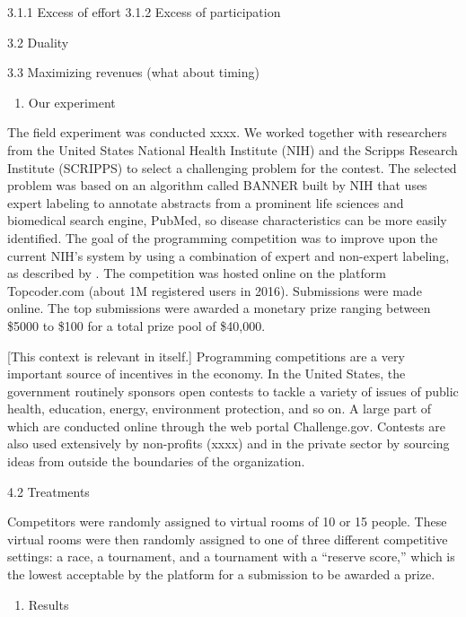 \documentclass[12pt,]{article}
\providecommand{\tightlist}{%
  \setlength{\itemsep}{0pt}\setlength{\parskip}{0pt}}
\begin{document}
3.1.1 Excess of effort 3.1.2 Excess of participation

3.2 Duality

3.3 Maximizing revenues (what about timing)

\begin{enumerate}
\def\labelenumi{\arabic{enumi}.}
\setcounter{enumi}{3}
\tightlist
\item
  Our experiment
\end{enumerate}

The field experiment was conducted xxxx. We worked together with
researchers from the United States National Health Institute (NIH) and
the Scripps Research Institute (SCRIPPS) to select a challenging problem
for the contest. The selected problem was based on an algorithm called
BANNER built by NIH \citep{leaman2008banner} that uses expert labeling
to annotate abstracts from a prominent life sciences and biomedical
search engine, PubMed, so disease characteristics can be more easily
identified. The goal of the programming competition was to improve upon
the current NIH's system by using a combination of expert and non-expert
labeling, as described by \citet{good2014microtask}. The competition was
hosted online on the platform Topcoder.com (about 1M registered users in
2016). Submissions were made online. The top submissions were awarded a
monetary prize ranging between \$5000 to \$100 for a total prize pool of
\$40,000.

{[}This context is relevant in itself.{]} Programming competitions are a
very important source of incentives in the economy. In the United
States, the government routinely sponsors open contests to tackle a
variety of issues of public health, education, energy, environment
protection, and so on. A large part of which are conducted online
through the web portal Challenge.gov. Contests are also used extensively
by non-profits (xxxx) and in the private sector by sourcing ideas from
outside the boundaries of the organization.

4.2 Treatments

Competitors were randomly assigned to virtual rooms of 10 or 15 people.
These virtual rooms were then randomly assigned to one of three
different competitive settings: a race, a tournament, and a tournament
with a ``reserve score,'' which is the lowest acceptable by the platform
for a submission to be awarded a prize.

\begin{enumerate}
\def\labelenumi{\arabic{enumi}.}
\setcounter{enumi}{4}
\tightlist
\item
  Results
\end{enumerate}
\end{document}
